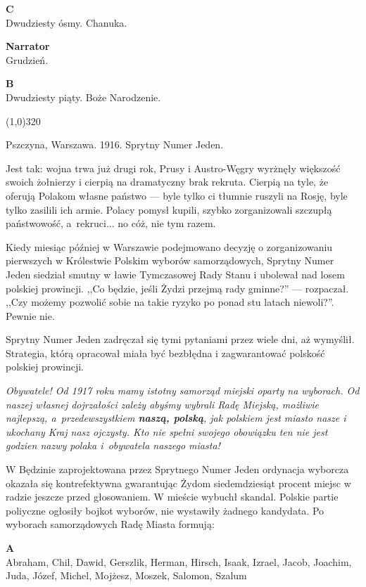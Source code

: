 \documentclass[11pt,a4paper,oneside]{article}
\begin{document}
\textbf{C}\\
Dwudziesty ósmy. Chanuka.

\textbf{Narrator}\\
Grudzień.

\textbf{B}\\
Dwudziesty piąty. Boże Narodzenie.

\line(1,0){320}

Pszczyna, Warszawa. 1916. Sprytny Numer Jeden. 

Jest tak: wojna trwa już drugi rok, Prusy i Austro-Węgry wyrżnęły
większość swoich żołnierzy i cierpią na dramatyczny brak rekruta.
Cierpią na tyle, że oferują Polakom własne państwo --- byle tylko ci
tłumnie ruszyli na Rosję, byle tylko zasilili ich armie. Polacy pomysł
kupili, szybko zorganizowali szczupłą państwowość, a~rekruci... no
cóż, nie tym razem.

Kiedy miesiąc później w Warszawie podejmowano decyzję o zorganizowaniu
pierwszych w Królestwie Polskim wyborów samorządowych, Sprytny Numer
Jeden siedział smutny w ławie Tymczasowej Rady Stanu i ubolewał nad
losem polskiej prowincji. ,,Co będzie, jeśli Żydzi przejmą rady
gminne?'' --- rozpaczał.  ,,Czy możemy pozwolić sobie na takie ryzyko
po ponad stu latach niewoli?''. Pewnie nie.

Sprytny Numer Jeden zadręczał się tymi pytaniami przez wiele dni, aż
wymyślił.  Strategia, którą opracował miała być bezbłędna
i zagwarantować polskość polskiej prowincji. 

\emph{Obywatele! Od 1917 roku mamy istotny samorząd miejski oparty na
wyborach. Od naszej własnej dojrzałości zależy abyśmy wybrali Radę
Miejską, możliwie najlepszą, a~przedewszystkiem \textbf{naszą,
polską}, jak polskiem jest miasto nasze i ukochany Kraj nasz ojczysty.
Kto nie spełni swojego obowiązku ten nie jest godzien nazwy polaka
i~obywatela naszego miasta!}

W Będzinie zaprojektowana przez Sprytnego Numer Jeden ordynacja
wyborcza okazała się kontrefektywna gwarantując Żydom siedemdziesiąt
procent miejsc w radzie jeszcze przed głosowaniem. W mieście wybuchł
skandal. Polskie partie poliyczne ogłosiły bojkot wyborów, nie
wystawiły żadnego kandydata. Po wyborach samorządowych Radę Miasta
formują:

\textbf{A}\\
Abraham, Chil, Dawid, Gerszlik, Herman, Hirsch, Isaak, Izrael, Jacob,
Joachim, Juda, Józef, Michel, Mojżesz, Moszek, Salomon, Szalum
\end{document}
